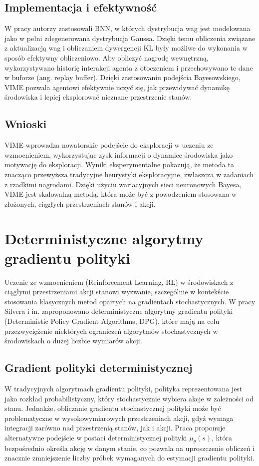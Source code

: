 \subsection{Implementacja i efektywność}
W pracy \cite{VIME} autorzy zastosowali BNN, w których dystrybucja wag jest modelowana jako w pełni zdegenerowana dystrybucja Gaussa. Dzięki temu obliczenia związane z aktualizacją wag i obliczaniem dywergencji KL były możliwe do wykonania w sposób efektywny obliczeniowo. Aby obliczyć nagrodę wewnętrzną, wykorzystywano historię interakcji agenta z otoczeniem i przechowywano te dane w buforze (ang. replay buffer). Dzięki zastosowaniu podejścia Bayesowskiego, VIME pozwala agentowi efektywnie uczyć się, jak przewidywać dynamikę środowiska i lepiej eksplorować nieznane przestrzenie stanów.

\subsection{Wnioski}
VIME wprowadza nowatorskie podejście do eksploracji w uczeniu ze wzmocnieniem, wykorzystując zysk informacji o dynamice środowiska jako motywację do eksploracji. Wyniki eksperymentalne pokazują, że metoda ta znacząco przewyższa tradycyjne heurystyki eksploracyjne, zwłaszcza w zadaniach z rzadkimi nagrodami. Dzięki użyciu wariacyjnych sieci neuronowych Bayesa, VIME jest skalowalną metodą, która może być z powodzeniem stosowana w złożonych, ciągłych przestrzeniach stanów i akcji.

\section{Deterministyczne algorytmy gradientu polityki}

Uczenie ze wzmocnieniem (Reinforcement Learning, RL) w środowiskach z ciągłymi przestrzeniami akcji stanowi wyzwanie, szczególnie w kontekście stosowania klasycznych metod opartych na gradientach stochastycznych. W pracy Silvera i in. \cite{GRAD} zaproponowano deterministyczne algorytmy gradientu polityki (Deterministic Policy Gradient Algorithms, DPG), które mają na celu przezwyciężenie niektórych ograniczeń algorytmów stochastycznych w środowiskach o dużej liczbie wymiarów akcji.

\subsection{Gradient polityki deterministycznej}
W tradycyjnych algorytmach gradientu polityki, polityka reprezentowana jest jako rozkład probabilistyczny, który stochastycznie wybiera akcje w zależności od stanu. Jednakże, obliczanie gradientu stochastycznej polityki może być problematyczne w wysokowymiarowych przestrzeniach akcji, gdyż wymaga integracji zarówno nad przestrzenią stanów, jak i akcji. Praca \cite{GRAD} proponuje alternatywne podejście w postaci deterministycznej polityki $\mu_\theta(s)$, która bezpośrednio określa akcję w danym stanie, co pozwala na uproszczenie obliczeń i znacznie zmniejszenie liczby próbek wymaganych do estymacji gradientu polityki.

